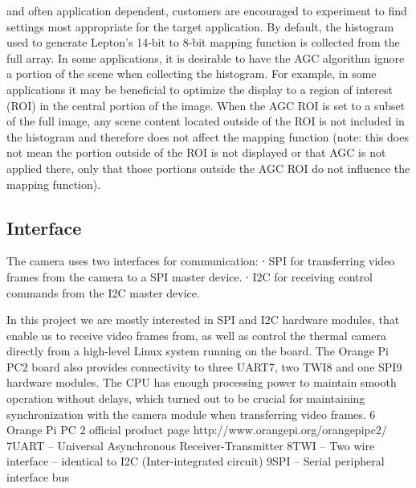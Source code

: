 and often application dependent, customers are encouraged to experiment to find
settings most appropriate for the target application. By default, the histogram
used to generate Lepton's 14-bit to 8-bit mapping function is collected from the
full array. In some applications, it is desirable to have the AGC algorithm
ignore a portion of the scene when collecting the histogram. For example, in
some applications it may be beneficial to optimize the display to a region of
interest (ROI) in the central portion of the image. When the AGC ROI is set to a
subset of the full image, any scene content located outside of the ROI is not
included in the histogram and therefore does not affect the mapping function
(note: this does not mean the portion outside of the ROI is not displayed or
that AGC is not applied there, only that those portions outside the AGC ROI do
not influence the mapping function).\cite{flirdatasheet}
%
\subsection{Interface}
\label{ssec:lepton-interface}

The camera uses two interfaces for communication:
∙ SPI for transferring video frames from the camera to a SPI master device. ∙ I2C for receiving control commands from the I2C master device.

In this project we are mostly interested in SPI and I2C hardware modules, that enable us to receive video frames from, as well as control the thermal camera directly from a high-level Linux system running on the board.
The Orange Pi PC2 board also provides connectivity to three UART7, two TWI8 and one SPI9 hardware modules.
The CPU has enough processing power to maintain smooth operation without delays, which turned out to be crucial for maintaining synchronization with the camera module when transferring video frames.
6 Orange Pi PC 2 official product page http://www.orangepi.org/orangepipc2/ 7UART – Universal Asynchronous Receiver-Transmitter
8TWI – Two wire interface – identical to I2C (Inter-integrated circuit)
9SPI – Serial peripheral interface bus



